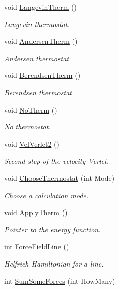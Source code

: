 \begin{DoxyCompactItemize}
void \hyperlink{classForces_a379f6968f484a2a975c657f07821731c}{Langevin\+Therm} ()
\begin{DoxyCompactList}\small\item\em Langevin thermostat. \end{DoxyCompactList}\item 
void \hyperlink{classForces_a731619cf10a23878480c0af79252ed3e}{Andersen\+Therm} ()
\begin{DoxyCompactList}\small\item\em Andersen thermostat. \end{DoxyCompactList}\item 
void \hyperlink{classForces_a795803d47c68fef34839e68ffb2de60e}{Berendsen\+Therm} ()
\begin{DoxyCompactList}\small\item\em Berendsen thermostat. \end{DoxyCompactList}\item 
void \hyperlink{classForces_ae11de37aafa6549029bdf20e36bee7f4}{No\+Therm} ()\hypertarget{classForces_ae11de37aafa6549029bdf20e36bee7f4}{}\label{classForces_ae11de37aafa6549029bdf20e36bee7f4}

\begin{DoxyCompactList}\small\item\em No thermostat. \end{DoxyCompactList}\item 
void \hyperlink{classForces_a7965b2207a6253f8215b96a7195cb5bc}{Vel\+Verlet2} ()
\begin{DoxyCompactList}\small\item\em Second step of the velocity Verlet. \end{DoxyCompactList}\item 
void \hyperlink{classForces_a8de191a7e9bb4c04ea140023c0bffaba}{Choose\+Thermostat} (int Mode)
\begin{DoxyCompactList}\small\item\em Choose a calculation mode. \end{DoxyCompactList}\item 
void \hyperlink{classForces_a0ccf73fded29832c9d6c8edad5a51b76}{Apply\+Therm} ()\hypertarget{classForces_a0ccf73fded29832c9d6c8edad5a51b76}{}\label{classForces_a0ccf73fded29832c9d6c8edad5a51b76}

\begin{DoxyCompactList}\small\item\em Pointer to the energy function. \end{DoxyCompactList}\item 
int \hyperlink{classForces_abe46a6cf819d53f35747565f9276854f}{Force\+Field\+Line} ()
\begin{DoxyCompactList}\small\item\em Helfrich Hamiltonian for a line. \end{DoxyCompactList}\item 
int \hyperlink{classForces_aad7c51f4a67ea41983881db33d1e5434}{Sum\+Some\+Forces} (int How\+Many)\hypertarget{classForces_aad7c51f4a67ea41983881db33d1e5434}{}\label{classForces_aad7c51f4a67ea41983881db33d1e5434}


\end{DoxyCompactItemize}
